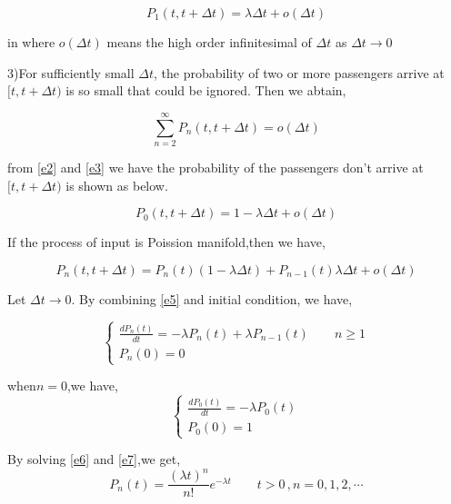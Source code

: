 \documentclass{mcmthesis}
\begin{document}
\begin{equation}
P_1(t,t+\Delta t)=\lambda \Delta t+o(\Delta t)  \label{e2}
\end{equation}

in where $o(\Delta t)$ means the high order infinitesimal of $\Delta t$ as $\Delta t \rightarrow 0$
\par 3)For sufficiently small $\Delta t$, the probability of two or more  passengers arrive at $[t,t+\Delta t)$ is so small that could be ignored. Then we abtain,
 
\begin{equation}  
\sum\limits_{n=2}^\infty P_n(t,t+\Delta t)=o(\Delta t)   \label{e3}
\end{equation}

from \eqref{e2} and  \eqref{e3} we have the probability of the  passengers don't arrive at $[t,t+\Delta t)$ is shown as below.

\begin{equation}
P_0(t,t+\Delta t)=1-\lambda \Delta t+o(\Delta t)
\end{equation}


If the process of input is Poission manifold,then we have,

\begin{equation}
P_n(t,t+\Delta t)=P_n(t)(1-\lambda \Delta t)+P_{n-1}(t)\lambda \Delta t+o(\Delta t) \label{e5}
\end{equation}

Let  $\Delta t \rightarrow 0$. By combining \eqref{e5} and initial condition, we have,

\begin{equation}    \label{e6}
\left\{
       \begin{array}{lr}
           \frac {d P_n(t)}{d t}=-\lambda P_n(t)+\lambda P_{n-1}(t)\qquad n\geqslant 1\\
            P_n(0)=0
        \end{array}
\right.
\end{equation}

when$n=0$,we have,
\begin{equation}    \label{e7}
\left\{
       \begin{array}{lr}
           \frac {d P_0(t)}{d t}=-\lambda P_0(t)\\
            P_0(0)=1
        \end{array}
\right.
\end{equation}


By solving \eqref{e6} and \eqref{e7},we get,
\begin{equation}
 P_n(t)=\frac{(\lambda t)^n}{n!} e^{-\lambda t}\qquad t>0\, , n=0,1,2,\cdots
\end{equation}
\end{document}
